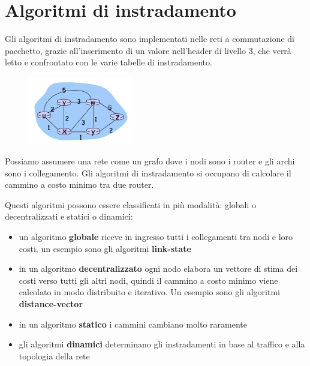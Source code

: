 \documentclass{report}
\begin{document}
\hypertarget{header-n165}{%
\section{Algoritmi di instradamento}\label{header-n165}}

Gli algoritmi di instradamento sono implementati nelle reti a
commutazione di pacchetto, grazie all'inserimento di un valore
nell'header di livello 3, che verrà letto e confrontato con le varie
tabelle di instradamento.

\begin{figure}
		\centering
		\vspace{-10pt}
		\includegraphics[width=0.4\textwidth]{grafo-rete}
		\vspace{-10pt}
	\end{figure}

Possiamo assumere una rete come un grafo dove i nodi sono i router e gli
archi sono i collegamento. Gli algoritmi di instradamento si occupano di
calcolare il cammino a costo minimo tra due router.

Questi algoritmi possono essere classificati in più modalità: globali o
decentralizzati e statici o dinamici:

\begin{itemize}
\item
  un algoritmo \textbf{globale} riceve in ingresso tutti i collegamenti
  tra nodi e loro costi, un esempio sono gli algoritmi
  \textbf{link-state}
\item
  in un algoritmo \textbf{decentralizzato} ogni nodo elabora un vettore
  di stima dei costi verso tutti gli altri nodi, quindi il cammino a
  costo minimo viene calcolato in modo distribuito e iterativo. Un
  esempio sono gli algoritmi \textbf{distance-vector}
\item
  in un algoritmo \textbf{statico} i cammini cambiano molto raramente
\item
  gli algoritmi \textbf{dinamici} determinano gli instradamenti in base
  al traffico e alla topologia della rete
\end{itemize}
\end{document}

